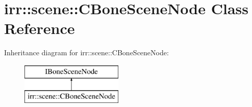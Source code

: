 \hypertarget{classirr_1_1scene_1_1_c_bone_scene_node}{\section{irr\-:\-:scene\-:\-:C\-Bone\-Scene\-Node Class Reference}
\label{classirr_1_1scene_1_1_c_bone_scene_node}
}
Inheritance diagram for irr\-:\-:scene\-:\-:C\-Bone\-Scene\-Node\-:\begin{figure}[H]
\begin{center}
\leavevmode
\includegraphics[height=2.000000cm]{classirr_1_1scene_1_1_c_bone_scene_node}
\end{center}
\end{figure}
